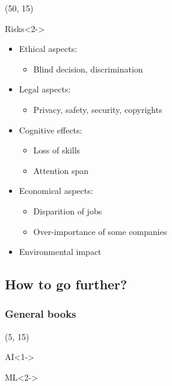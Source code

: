 \begin{frame}
  \begin{textblock}{45}(50, 15)
    \begin{block}{Risks}<2->
      \begin{itemize}
      \item Ethical aspects:
        \begin{itemize}
        \item Blind decision, discrimination
        \end{itemize}
      \item Legal aspects:
        \begin{itemize}
        \item Privacy, safety, security, copyrights
        \end{itemize}
      \item Cognitive effects:
        \begin{itemize}
        \item Loss of skills
        \item Attention span
        \end{itemize}
      \item Economical aspects:
        \begin{itemize}
        \item Disparition of jobs
        \item Over-importance of some companies
        \end{itemize}
      \item Environmental impact
      \end{itemize}
    \end{block}
  \end{textblock}
\end{frame}


\subsection{How to go further?}

\begin{frame}
  \frametitle{General books}

  \nocite{*}

  \begin{textblock}{90}(5, 15)
    \begin{block}{AI}<1->
      \printbibliography[heading=none,category=AI]
    \end{block}

    \begin{block}{\ac{ML}}<2->
      \printbibliography[heading=none,category=ML]
    \end{block}
  \end{textblock}
\end{frame}

